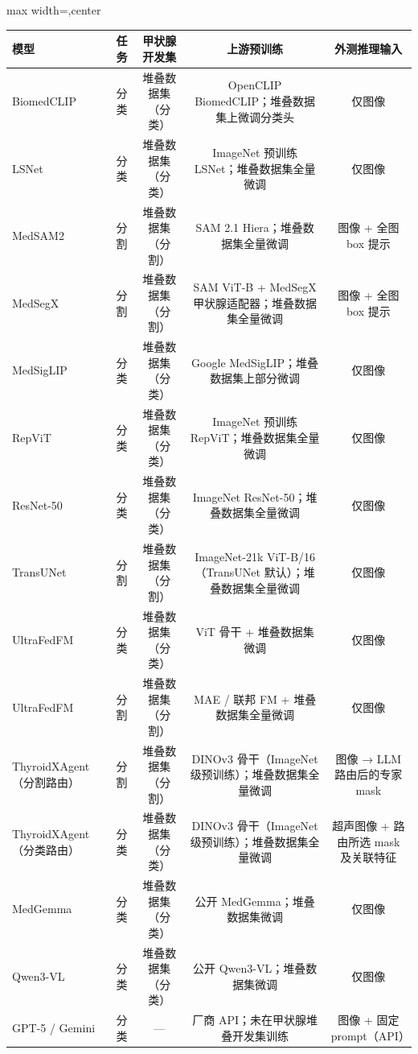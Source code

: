 \begin{responsetable}
\caption{}
\begin{adjustbox}{max width=\textwidth,center}
\begin{tabular}{lcccc}
\toprule
模型 & 任务 & 甲状腺开发集 & 上游预训练 & 外测推理输入 \\
\midrule
BiomedCLIP & 分类 & 堆叠数据集（分类） & OpenCLIP BiomedCLIP；堆叠数据集上微调分类头 & 仅图像 \\
LSNet & 分类 & 堆叠数据集（分类） & ImageNet 预训练 LSNet；堆叠数据集全量微调 & 仅图像 \\
MedSAM2 & 分割 & 堆叠数据集（分割） & SAM 2.1 Hiera；堆叠数据集全量微调 & 图像 + 全图 box 提示 \\
MedSegX & 分割 & 堆叠数据集（分割） & SAM ViT-B + MedSegX 甲状腺适配器；堆叠数据集全量微调 & 图像 + 全图 box 提示 \\
MedSigLIP & 分类 & 堆叠数据集（分类） & Google MedSigLIP；堆叠数据集上部分微调 & 仅图像 \\
RepViT & 分类 & 堆叠数据集（分类） & ImageNet 预训练 RepViT；堆叠数据集全量微调 & 仅图像 \\
ResNet-50 & 分类 & 堆叠数据集（分类） & ImageNet ResNet-50；堆叠数据集全量微调 & 仅图像 \\
TransUNet & 分割 & 堆叠数据集（分割） & ImageNet-21k ViT-B/16（TransUNet 默认）；堆叠数据集全量微调 & 仅图像 \\
UltraFedFM & 分类 & 堆叠数据集（分类） & ViT 骨干 + 堆叠数据集微调 & 仅图像 \\
UltraFedFM & 分割 & 堆叠数据集（分割） & MAE / 联邦 FM + 堆叠数据集全量微调 & 仅图像 \\
ThyroidXAgent（分割路由） & 分割 & 堆叠数据集（分割） & DINOv3 骨干（ImageNet 级预训练）；堆叠数据集全量微调 & 图像 → LLM 路由后的专家 mask \\
ThyroidXAgent（分类路由） & 分类 & 堆叠数据集（分类） & DINOv3 骨干（ImageNet 级预训练）；堆叠数据集全量微调 & 超声图像 + 路由所选 mask 及关联特征 \\
MedGemma & 分类 & 堆叠数据集（分类） & 公开 MedGemma；堆叠数据集微调 & 仅图像 \\
Qwen3-VL & 分类 & 堆叠数据集（分类） & 公开 Qwen3-VL；堆叠数据集微调 & 仅图像 \\
GPT-5 / Gemini & 分类 & --- & 厂商 API；未在甲状腺堆叠开发集训练 & 图像 + 固定 prompt（API） \\

\end{tabular}
\end{adjustbox}
\end{responsetable}
